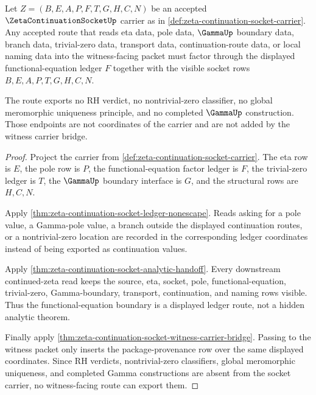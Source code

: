 \begin{theorem}
\label{thm:zeta-continuation-socket-functional-equation-boundary}
Let $Z=(B,E,A,P,F,T,G,H,C,N)$ be an accepted $\ZetaContinuationSocketUp$ carrier as in \autoref{def:zeta-continuation-socket-carrier}. Any accepted route that reads eta data, pole data, $\GammaUp$ boundary data, branch data, trivial-zero data, transport data, continuation-route data, or local naming data into the witness-facing packet must factor through the displayed functional-equation ledger $F$ together with the visible socket rows $B,E,A,P,T,G,H,C,N$.

The route exports no RH verdict, no nontrivial-zero classifier, no global meromorphic uniqueness principle, and no completed $\GammaUp$ construction. Those endpoints are not coordinates of the carrier and are not added by the witness carrier bridge.
\end{theorem}
\begin{proof}
Project the carrier from \autoref{def:zeta-continuation-socket-carrier}. The eta row is $E$, the pole row is $P$, the functional-equation factor ledger is $F$, the trivial-zero ledger is $T$, the $\GammaUp$ boundary interface is $G$, and the structural rows are $H,C,N$.

Apply \autoref{thm:zeta-continuation-socket-ledger-nonescape}. Reads asking for a pole value, a Gamma-pole value, a branch outside the displayed continuation routes, or a nontrivial-zero location are recorded in the corresponding ledger coordinates instead of being exported as continuation values.

Apply \autoref{thm:zeta-continuation-socket-analytic-handoff}. Every downstream continued-zeta read keeps the source, eta, socket, pole, functional-equation, trivial-zero, Gamma-boundary, transport, continuation, and naming rows visible. Thus the functional-equation boundary is a displayed ledger route, not a hidden analytic theorem.

Finally apply \autoref{thm:zeta-continuation-socket-witness-carrier-bridge}. Passing to the witness packet only inserts the package-provenance row over the same displayed coordinates. Since RH verdicts, nontrivial-zero classifiers, global meromorphic uniqueness, and completed Gamma constructions are absent from the socket carrier, no witness-facing route can export them.
\end{proof}

